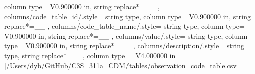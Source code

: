 \begin{landscape}
{            column type= V{0.900000 in}, 
            string replace*={_}{\_}
        },
    columns/code_table_id/.style={
            string type, 
            column type= V{0.900000 in}, 
            string replace*={_}{\_}
        },
    columns/code_table_name/.style={
            string type, 
            column type= V{0.900000 in}, 
            string replace*={_}{\_}
        },
    columns/value/.style={
            string type, 
            column type= V{0.900000 in}, 
            string replace*={_}{\_}
        },
    columns/description/.style={
            string type, 
            string replace*={_}{\_},
            column type = V{4.000000 in}
        }
    ]{/Users/dyb/GitHub/C3S_311a_CDM/tables/observation_code_table.csv}
\end{landscape}
